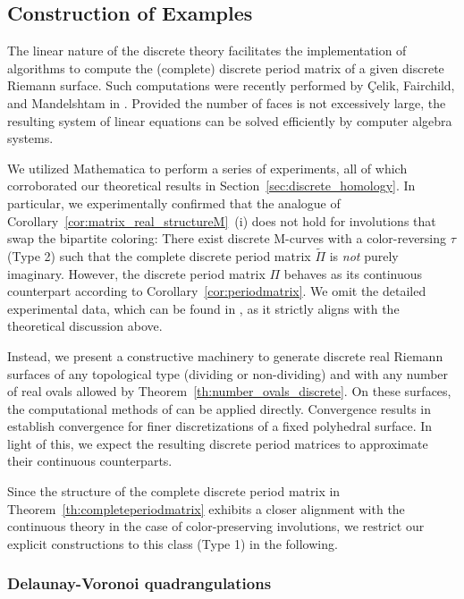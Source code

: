 \documentclass[11pt,a4paper]{article}
\theoremstyle{definition}
\begin{document}
\subsection{Construction of Examples}\label{sec:examples}

The linear nature of the discrete theory facilitates the implementation of algorithms to compute the (complete) discrete period matrix of a given discrete Riemann surface. Such computations were recently performed by \c{C}elik, Fairchild, and Mandelshtam in \cite{CFM23}. Provided the number of faces is not excessively large, the resulting system of linear equations can be solved efficiently by computer algebra systems.

We utilized Mathematica to perform a series of experiments, all of which corroborated our theoretical results in Section~\ref{sec:discrete_homology}. In particular, we experimentally confirmed that the analogue of Corollary~\ref{cor:matrix_real_structureM}~(i) does not hold for involutions that swap the bipartite coloring: There exist discrete M-curves with a color-reversing $\tau$ (Type 2) such that the complete discrete period matrix $\tilde{\Pi}$ is \emph{not} purely imaginary. However, the discrete period matrix $\Pi$ behaves as its continuous counterpart according to Corollary~\ref{cor:periodmatrix}.
We omit the detailed experimental data, which can be found in \cite{D23}, as it strictly aligns with the theoretical discussion above.

Instead, we present a constructive machinery to generate discrete real Riemann surfaces of any topological type (dividing or non-dividing) and with any number of real ovals allowed by Theorem~\ref{th:number_ovals_discrete}. On these surfaces, the computational methods of \cite{CFM23} can be applied directly. Convergence results in \cite{G23} establish convergence for finer discretizations of a fixed polyhedral surface. In light of this, we expect the resulting discrete period matrices to approximate their continuous counterparts.

Since the structure of the complete discrete period matrix in Theorem~\ref{th:completeperiodmatrix} exhibits a closer alignment with the continuous theory in the case of color-preserving involutions, we restrict our explicit constructions to this class (Type 1) in the following.

\subsubsection*{Delaunay-Voronoi quadrangulations}
\end{document}

